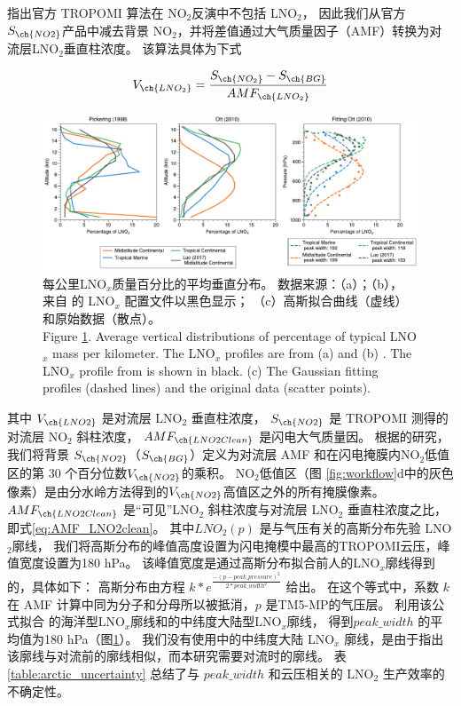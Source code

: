 \citet{Zhang.2022a}指出官方 TROPOMI 算法在 NO$_2$反演中不包括 LNO$_2$，
因此我们从官方 $S_{\ch{NO2}}$产品中减去背景 NO$_2$，并将差值通过大气质量因子（AMF）转换为对流层LNO$_2$垂直柱浓度。
该算法具体为下式


\begin{equation} \label{eq:arctic_LNO2}
V_{\ch{LNO_2}} = \frac{S_{\ch{NO_2}} - S_{\ch{BG}}}{AMF_{\ch{LNO_2}}}
\end{equation}

\begin{figure}[!htbp]
\centering
\includegraphics[width=16cm]{./figures/arctic_lnox_profile.pdf}
\caption{
每公里LNO$_x$质量百分比的平均垂直分布。
数据来源：（a）\citet{Pickering.1998}；（b）\citet{Ott.2010}，
来自 \citet{Luo.2017} 的 LNO$_x$ 配置文件以黑色显示；
（c）高斯拟合曲线（虚线）和原始数据（散点）。\\
Figure \ref{fig:arctic_lnox_profile}.
Average vertical distributions of percentage of typical LNO$_x$ mass per kilometer.
The LNO$_x$ profiles are from (a) \citet{Pickering.1998} and (b) \citet{Ott.2010}.
The LNO$_x$ profile from \citet{Luo.2017} is shown in black.
(c) The Gaussian fitting profiles (dashed lines) and the original data (scatter points).
}
\label{fig:arctic_lnox_profile}
\end{figure}

其中 $V_{\ch{LNO2}}$ 是对流层 LNO$_2$ 垂直柱浓度，
$S_{\ch{NO2}}$ 是 TROPOMI 测得的对流层 NO$_2$ 斜柱浓度，
$AMF_{\ch{LNO2Clean}}$ 是闪电大气质量因。
根据\citet{Allen.2021a}的研究，我们将背景 $S_{\ch{NO2}}$（$S_{\ch{BG}}$）定义为对流层 AMF 和在闪电掩膜内NO$_2$低值区的第 30 个百分位数$V_{\ch{NO2}}$的乘积。
NO$_2$低值区（图 \ref{fig:workflow}d中的灰色像素）是由分水岭方法得到的$V_{\ch{NO2}}$高值区之外的所有掩膜像素。
$AMF_{\ch{LNO2Clean}}$ 是“可见”LNO$_2$ 斜柱浓度与对流层 LNO$_2$ 垂直柱浓度之比，即式\ref{eq:AMF_LNO2clean}。
其中$LNO_2(p)$ 是与气压有关的高斯分布先验 LNO$_2$廓线，
我们将高斯分布的峰值高度设置为闪电掩模中最高的TROPOMI云压，峰值宽度设置为180 hPa。
该峰值宽度是通过高斯分布拟合前人的LNO$_x$廓线得到的，具体如下：
高斯分布由方程 $k*e^\frac{{-{(p - peak\_pressure)}^2}}{2*peak\_width^{2}}$ 给出。
在这个等式中，系数 $k$ 在 AMF 计算中同为分子和分母所以被抵消，$p$ 是TM5-MP的气压层。
利用该公式拟合 \citet{Ott.2010} 的海洋型LNO$_x$廓线和\citet{Luo.2017}的中纬度大陆型LNO$_x$廓线，
得到$peak\_width$ 的平均值为180 hPa（图\ref{fig:arctic_lnox_profile}）。
我们没有使用\citet{Ott.2010}中的中纬度大陆 LNO$_x$ 廓线，是由于\citet{Luo.2017}指出该廓线与对流前的廓线相似，而本研究需要对流时的廓线。
表 \ref{table:arctic_uncertainty} 总结了与 $peak\_width$ 和云压相关的 LNO$_2$ 生产效率的不确定性。

